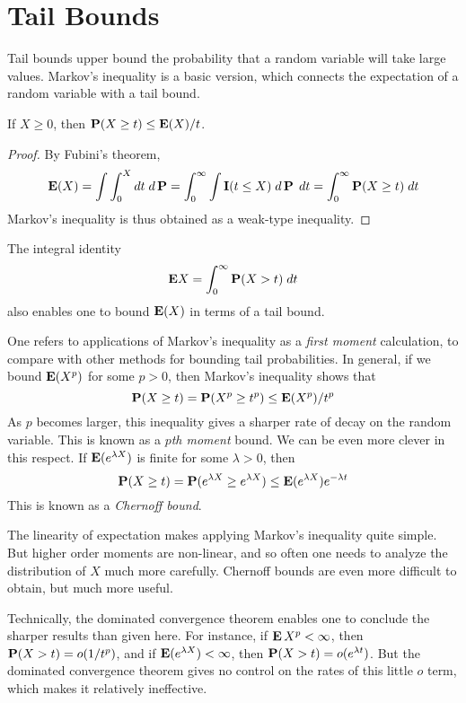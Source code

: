 \section{Tail Bounds}

Tail bounds upper bound the probability that a random variable will take large values. Markov's inequality is a basic version, which connects the expectation of a random variable with a tail bound.

\begin{theorem}
    If $X \geq 0$, then $\operatorname{\mathbf{P}}(X \geq t) \leq \mathbf{E}(X) / t$.
\end{theorem}
\begin{proof}
    By Fubini's theorem,
    \[ \mathbf{E}(X) = \int \int_0^X dt\; d\operatorname{\mathbf{P}} = \int_0^\infty \int \mathbf{I}(t \leq X)\; d\operatorname{\mathbf{P}}\; dt = \int_0^\infty \operatorname{\mathbf{P}}(X \geq t)\; dt \]
    Markov's inequality is thus obtained as a weak-type inequality.
\end{proof}

\begin{remark}
    The integral identity
    \[ \mathbf{E} X = \int_0^\infty \operatorname{\mathbf{P}}(X > t)\; dt \]
    also enables one to bound $\operatorname{\mathbf{E}}(X)$ in terms of a tail bound.
\end{remark}

One refers to applications of Markov's inequality as a \emph{first moment} calculation, to compare with other methods for bounding tail probabilities. In general, if we bound $\operatorname{\mathbf{E}}(X^p)$ for some $p > 0$, then Markov's inequality shows that
%
\[ \mathbf{P}(X \geq t) = \mathbf{P}(X^p \geq t^p) \leq \operatorname{\mathbf{E}}(X^p)/t^p \]
%
As $p$ becomes larger, this inequality gives a sharper rate of decay on the random variable. This is known as a \emph{$p$th moment} bound. We can be even more clever in this respect. If $\operatorname{\mathbf{E}}(e^{\lambda X})$ is finite for some $\lambda > 0$, then
%
\[ \operatorname{\mathbf{P}}(X \geq t) = \operatorname{\mathbf{P}}(e^{\lambda X} \geq e^{\lambda X}) \leq \mathbf{E}(e^{\lambda X}) e^{-\lambda t} \]
%
This is known as a \emph{Chernoff bound}.

\begin{remark}
    The linearity of expectation makes applying Markov's inequality quite simple. But higher order moments are non-linear, and so often one needs to analyze the distribution of $X$ much more carefully. Chernoff bounds are even more difficult to obtain, but much more useful.
\end{remark}

\begin{remark}
    Technically, the dominated convergence theorem enables one to conclude the sharper results than given here. For instance, if $\operatorname{\mathbf{E}} X^p < \infty$, then $\mathbf{P}(X > t) = o(1/t^p)$, and if $\operatorname{\mathbf{E}}(e^{\lambda X}) < \infty$, then $\mathbf{P}(X > t) = o(e^{\lambda t})$. But the dominated convergence theorem gives no control on the rates of this little $o$ term, which makes it relatively ineffective.
\end{remark}

